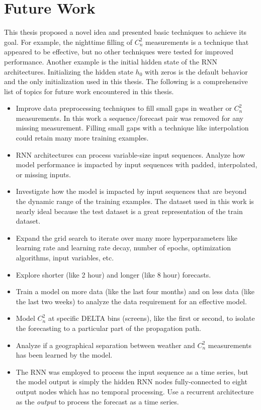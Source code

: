 \section{Future Work}
This thesis proposed a novel idea and presented basic techniques to achieve its goal. For example, the nighttime filling of $C_{n}^{2}$ measurements is a technique that appeared to be effective, but no other techniques were tested for improved performance. Another example is the initial hidden state of the \ac{RNN} architectures. Initializing the hidden state $h_{0}$ with zeros is the default behavior and the only initialization used in this thesis. The following is a comprehensive list of topics for future work encountered in this thesis.
\begin{itemize}
	\item Improve data preprocessing techniques to fill small gaps in weather or $C_{n}^{2}$ measurements. In this work a sequence/forecast pair was removed for any missing measurement. Filling small gaps with a technique like interpolation could retain many more training examples.
	\item \ac{RNN} architectures can process variable-size input sequences. Analyze how model performance is impacted by input sequences with padded, interpolated, or missing inputs.
	\item Investigate how the model is impacted by input sequences that are beyond the dynamic range of the training examples. The dataset used in this work is nearly ideal because the test dataset is a great representation of the train dataset.
	\item Expand the grid search to iterate over many more hyperparameters like learning rate and learning rate decay, number of epochs, optimization algorithms, input variables, etc.
	\item Explore shorter (like 2 hour) and longer (like 8 hour) forecasts.
	\item Train a model on more data (like the last four months) and on less data (like the last two weeks) to analyze the data requirement for an effective model.
	\item Model $C_{n}^{2}$ at specific DELTA bins (screens), like the first or second, to isolate the forecasting to a particular part of the propagation path.
	\item Analyze if a geographical separation between weather and $C_{n}^{2}$ measurements has been learned by the model.
	\item The \ac{RNN} was employed to process the input sequence as a time series, but the model output is simply the hidden \ac{RNN} nodes fully-connected to eight output nodes which has no temporal processing. Use a recurrent architecture as the \emph{output} to process the forecast as a time series.
\end{itemize}